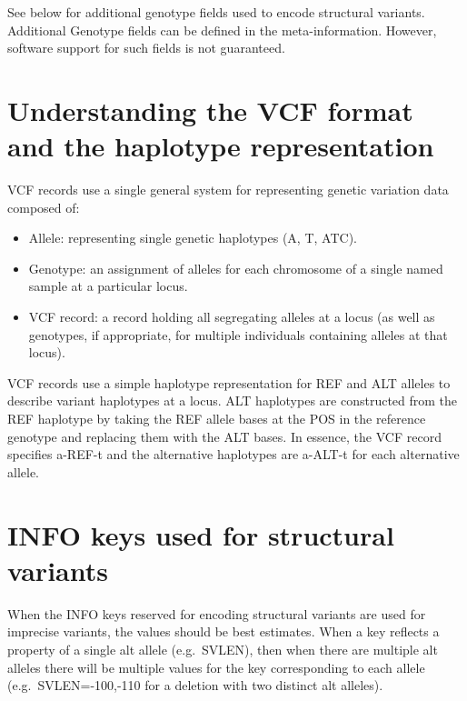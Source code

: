 \documentclass[8pt]{article}
\begin{document}
See below for additional genotype fields used to encode structural variants. Additional Genotype fields can be defined in the meta-information. However, software support for such fields is not guaranteed.

\section{Understanding the VCF format and the haplotype representation}
VCF records use a single general system for representing genetic variation data composed of:
\begin{itemize}
  \item Allele: representing single genetic haplotypes (A, T, ATC).
  \item Genotype: an assignment of alleles for each chromosome of a single named sample at a particular locus.
  \item VCF record: a record holding all segregating alleles at a locus (as well as genotypes, if appropriate, for multiple individuals containing alleles at that locus).
\end{itemize}
VCF records use a simple haplotype representation for REF and ALT alleles to describe variant haplotypes at a locus. ALT haplotypes are constructed from the REF haplotype by taking the REF allele bases at the POS in the reference genotype and replacing them with the ALT bases. In essence, the VCF record specifies a-REF-t and the alternative haplotypes are a-ALT-t for each alternative allele.


\section{INFO keys used for structural variants}
When the INFO keys reserved for encoding structural variants are used for imprecise variants, the values should be best estimates. When a key reflects a property of a single alt allele (e.g.\ SVLEN), then when there are multiple alt alleles there will be multiple values for the key corresponding to each allele (e.g.\ SVLEN=-100,-110 for a deletion with two distinct alt alleles).
\end{document}

